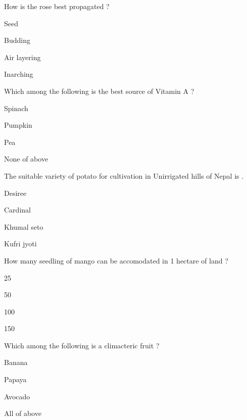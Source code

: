 \begin{questions}
\question How is the rose best propagated ?
\begin{items}
\item Seed
\item* Budding
\item Air layering
\item Inarching
\end{items}

\question Which among the following is the best source of Vitamin A ?
\begin{items}
\item* Spinach
\item Pumpkin
\item Pea
\item None of above
\end{items}

\question The suitable variety of potato for cultivation in Unirrigated hills of Nepal is \fillin[][3cm].
\begin{items}
\item Desiree
\item Cardinal
\item* Khumal seto
\item Kufri jyoti
\end{items}

\question How many seedling of mango can be accomodated in 1 hectare of land ?
\begin{items}
\item 25
\item 50
\item* 100
\item 150
\end{items}

\question Which among the following is a climacteric fruit ?
\begin{items}
\item Banana
\item Papaya
\item Avocado
\item* All of above
\end{items}

\end{questions}
